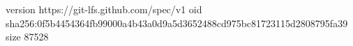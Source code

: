 version https://git-lfs.github.com/spec/v1
oid sha256:0f5b4454364fb99000a4b43a0d9a5d3652488cd975bc81723115d2808795fa39
size 87528
